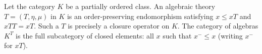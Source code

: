 Let the category $K$ be a partially ordered class. An algebraic theory $T = (T, \eta, \mu)$ in $K$ is an order-preserving endomorphism satisfying $x \leqslant xT$ and $xTT = xT$. Such a $T$ is precisely a closure operator on $K$. The category of algebras $K^T$ is the full subcategory of closed elements: all $x$ such that $x^{-} \leqslant x$ (writing $x^{-}$ for $xT$).
